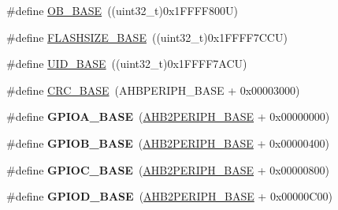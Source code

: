 \begin{DoxyCompactItemize}
\item 
\#define \hyperlink{group___peripheral__memory__map_gab5b5fb155f9ee15dfb6d757da1adc926}{O\+B\+\_\+\+B\+A\+SE}~((uint32\+\_\+t)0x1\+F\+F\+F\+F800\+U)
\item 
\#define \hyperlink{group___peripheral__memory__map_ga776d985f2d4d40b588ef6ca9d573af78}{F\+L\+A\+S\+H\+S\+I\+Z\+E\+\_\+\+B\+A\+SE}~((uint32\+\_\+t)0x1\+F\+F\+F\+F7\+C\+C\+U)
\item 
\#define \hyperlink{group___peripheral__memory__map_ga664eda42b83c919b153b07b23348be67}{U\+I\+D\+\_\+\+B\+A\+SE}~((uint32\+\_\+t)0x1\+F\+F\+F\+F7\+A\+C\+U)
\item 
\#define \hyperlink{group___peripheral__memory__map_ga656a447589e785594cbf2f45c835ad7e}{C\+R\+C\+\_\+\+B\+A\+SE}~(A\+H\+B\+P\+E\+R\+I\+P\+H\+\_\+\+B\+A\+SE + 0x00003000)
\item 
\mbox{\label{group___peripheral__memory__map_gad7723846cc5db8e43a44d78cf21f6efa}} 
\#define {\bfseries G\+P\+I\+O\+A\+\_\+\+B\+A\+SE}~(\hyperlink{group___peripheral__memory__map_gaeedaa71d22a1948492365e2cd26cfd46}{A\+H\+B2\+P\+E\+R\+I\+P\+H\+\_\+\+B\+A\+SE} + 0x00000000)
\item 
\mbox{\label{group___peripheral__memory__map_gac944a89eb789000ece920c0f89cb6a68}} 
\#define {\bfseries G\+P\+I\+O\+B\+\_\+\+B\+A\+SE}~(\hyperlink{group___peripheral__memory__map_gaeedaa71d22a1948492365e2cd26cfd46}{A\+H\+B2\+P\+E\+R\+I\+P\+H\+\_\+\+B\+A\+SE} + 0x00000400)
\item 
\mbox{\label{group___peripheral__memory__map_ga26f267dc35338eef219544c51f1e6b3f}} 
\#define {\bfseries G\+P\+I\+O\+C\+\_\+\+B\+A\+SE}~(\hyperlink{group___peripheral__memory__map_gaeedaa71d22a1948492365e2cd26cfd46}{A\+H\+B2\+P\+E\+R\+I\+P\+H\+\_\+\+B\+A\+SE} + 0x00000800)
\item 
\mbox{\label{group___peripheral__memory__map_ga1a93ab27129f04064089616910c296ec}} 
\#define {\bfseries G\+P\+I\+O\+D\+\_\+\+B\+A\+SE}~(\hyperlink{group___peripheral__memory__map_gaeedaa71d22a1948492365e2cd26cfd46}{A\+H\+B2\+P\+E\+R\+I\+P\+H\+\_\+\+B\+A\+SE} + 0x00000\+C00)
\item 
\mbox{\label{group___peripheral__memory__map_ga7f9a3f4223a1a784af464a114978d26e}} 

\end{DoxyCompactItemize}
